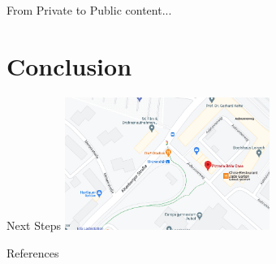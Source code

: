 \documentclass[11pt,compress,xcolor={usenames,dvipsnames},aspectratio=169]{beamer}
\begin{document}
\begin{frame}{From Private to Public}
	content...
\end{frame}

\section{Conclusion}

\begin{frame}{Next Steps}
	\includegraphics[width=0.5\textwidth]{ProgramsImages/PizeriaBellaCasa.png}
\end{frame}

\begin{frame}[allowframebreaks]{References}
	\printbibliography
\end{frame}
\end{document}
